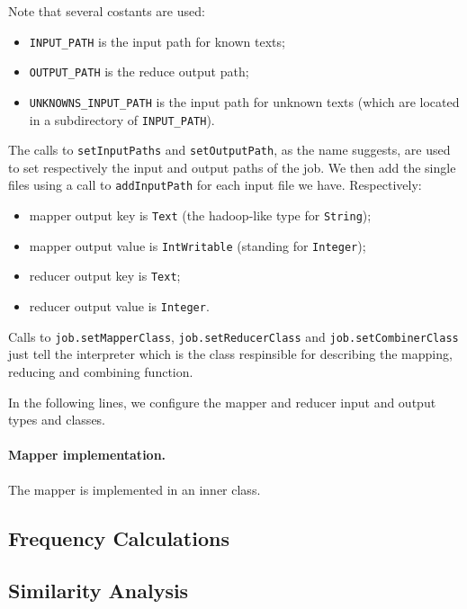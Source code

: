 \documentclass[a4paper,11pt, twoside]{article}
\begin{document}
	Note that several costants are used: \begin{itemize}
		\item \lstinline|INPUT_PATH| is the input path for known texts;
		\item \lstinline|OUTPUT_PATH| is the reduce output path;
		\item \lstinline|UNKNOWNS_INPUT_PATH| is the input path for unknown texts (which are located in a subdirectory of \lstinline|INPUT_PATH|).
	\end{itemize}

	The calls to \lstinline|setInputPaths| and \lstinline|setOutputPath|, as the name suggests, are used to set respectively the input and output paths of the job. We then add the single files using a call to \lstinline|addInputPath| for each input file we have. Respectively: \begin{itemize}
		\item mapper output key is \lstinline|Text| (the hadoop-like type for \lstinline|String|);
		\item mapper output value is \lstinline|IntWritable| (standing for \lstinline|Integer|);
		\item reducer output key is \lstinline|Text|;
		\item reducer output value is \lstinline|Integer|.
	\end{itemize}

	Calls to \lstinline|job.setMapperClass|, \lstinline|job.setReducerClass| and \lstinline|job.setCombinerClass| just tell the interpreter which is the class respinsible for describing the mapping, reducing and combining function.
	
	\bigskip
	\noindent
	In the following lines, we configure the mapper and reducer input and output types and classes.
	
	\paragraph{Mapper implementation.} The mapper is implemented in an inner class. 

	\subsection{Frequency Calculations}

	\subsection{Similarity Analysis}

	\newpage

	\printbibheading
	\printbibliography[nottype=book,heading=subbibliography,title={Online Sources}]
\end{document}
